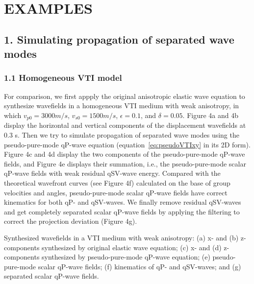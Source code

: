 \section{EXAMPLES}
\subsection{1. Simulating propagation of separated wave modes}

\subsubsection{1.1 Homogeneous VTI model}

For comparison, we first appply the original anisotropic elastic wave equation
 to synthesize wavefields in a homogeneous VTI medium with weak anisotropy, in which
$v_{p0}=3000 m/s$, $v_{s0}=1500 m/s$, $\epsilon=0.1$, and $\delta=0.05$. 
Figure 4a and 4b display the horizontal and vertical components of the displacement wavefields at 0.3 s.
 Then we try to simulate propagation of separated wave modes using the pseudo-pure-mode qP-wave equation 
(equation~\ref{eq:pseudoVTIxy} in its 2D form).
 Figure 4c and 4d display the two components of the pseudo-pure-mode qP-wave fields, and Figure 4e
 displays their summation, i.e., the pseudo-pure-mode scalar qP-wave fields with weak residual qSV-wave energy. 
 Compared with the theoretical wavefront curves (see Figure 4f) calculated
on the base of group velocities
 and angles, pseudo-pure-mode scalar qP-wave fields have correct kinematics for both qP- and qSV-waves.
We finally remove residual qSV-waves and get completely separated scalar qP-wave fields by 
 applying the filtering to correct the projection deviation (Figure 4g).

{
Synthesized wavefields in a VTI medium with weak anisotropy: (a) x- and
(b) z-components synthesized by original elastic wave equation; (c) x- and
 (d) z-components synthesized by pseudo-pure-mode qP-wave equation; (e) pseudo-pure-mode scalar qP-wave fields; 
(f) kinematics of qP- and qSV-waves; and (g) separated scalar qP-wave fields.
}


